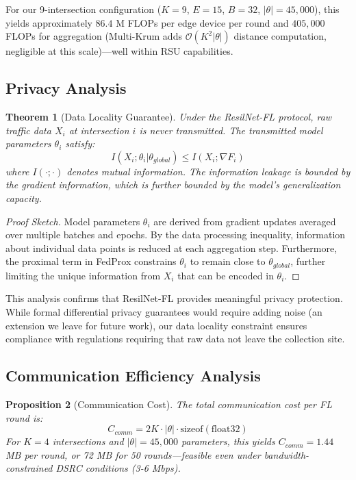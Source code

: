 \documentclass[conference]{IEEEtran}
\newtheorem{theorem}{Theorem}
\newtheorem{proposition}[theorem]{Proposition}
\begin{document}
For our 9-intersection configuration ($K=9$, $E=15$, $B=32$, $|\theta|=45,000$), this yields approximately $86.4$ M FLOPs per edge device per round and $405,000$ FLOPs for aggregation (Multi-Krum adds $\mathcal{O}(K^2 |\theta|)$ distance computation, negligible at this scale)---well within RSU capabilities.

\subsection{Privacy Analysis}

\begin{theorem}[Data Locality Guarantee]
Under the ResilNet-FL protocol, raw traffic data $X_i$ at intersection $i$ is never transmitted. The transmitted model parameters $\theta_i$ satisfy:
\begin{equation}
I(X_i; \theta_i | \theta_{global}) \leq I(X_i; \nabla F_i)
\end{equation}
where $I(\cdot;\cdot)$ denotes mutual information. The information leakage is bounded by the gradient information, which is further bounded by the model's generalization capacity.
\end{theorem}

\begin{proof}[Proof Sketch]
Model parameters $\theta_i$ are derived from gradient updates averaged over multiple batches and epochs. By the data processing inequality, information about individual data points is reduced at each aggregation step. Furthermore, the proximal term in FedProx constrains $\theta_i$ to remain close to $\theta_{global}$, further limiting the unique information from $X_i$ that can be encoded in $\theta_i$.
\end{proof}

This analysis confirms that ResilNet-FL provides meaningful privacy protection. While formal differential privacy guarantees would require adding noise (an extension we leave for future work), our data locality constraint ensures compliance with regulations requiring that raw data not leave the collection site.

\subsection{Communication Efficiency Analysis}

\begin{proposition}[Communication Cost]
The total communication cost per FL round is:
\begin{equation}
C_{comm} = 2K \cdot |\theta| \cdot \text{sizeof}(\text{float32})
\end{equation}
For $K=4$ intersections and $|\theta|=45,000$ parameters, this yields $C_{comm} = 1.44$ MB per round, or 72 MB for 50 rounds---feasible even under bandwidth-constrained DSRC conditions (3-6 Mbps).
\end{proposition}
\end{document}
